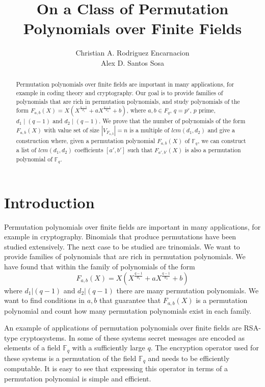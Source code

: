 \documentclass{article}
\theoremstyle{definition}
\theoremstyle{remark}
\numberwithin{equation}{section}
\begin{document}
\title{On a Class of Permutation Polynomials over Finite Fields}

\author{Christian A. Rodriguez Encarnacion \\ Alex D. Santos Sosa}

\maketitle

\begin{abstract}
Permutation polynomials over finite fields are important in many applications, for example in coding theory and cryptography. Our goal is to provide families of polynomials that are rich in permutation polynomials, and study polynomials of the form $F_{a,b}(X) =X\left(X^{\frac{q-1}{d_1}} + a X^{\frac{q-1}{d_2}} + b \right)$, where $a,b \in F_{q}$, $q=p^r$, $p$ prime, $d_1 \mid (q-1)$ and $d_2 \mid (q-1)$. We prove that the number of polynomials of the form $F_{a,b}(X)$ with value set of size $\left\vert V_{F_{a,b}} \right\vert =n$ is a multiple of $lcm(d_1,d_2)$ and give a construction where, given a permutation polynomial $F_{a,b}(X)$ of $\mathbb{F}_q$, we can construct a list of $lcm(d_1,d_2)$ coefficients $[a',b']$ such that $F_{a',b'}(X)$ is also a permutation polynomial of $\mathbb{F}_q$.
\end{abstract}


\section{Introduction}

Permutation polynomials over finite fields are important in many applications, for example in cryptography. Binomials that produce permutations have been studied extensively. The next case to be studied are trinomials. We want to provide families of polynomials that are rich in permutation polynomials. We have found that within the family of polynomials of the form $$F_{a,b}(X) = X(X^{\frac{q-1}{d_1}} + aX^{\frac{q-1}{d_2}} +b)$$ where $d_1 | (q-1)$ and $d_2 | (q-1)$  there are many permutation polynomials. We want to find conditions in $a,b$ that guarantee that $F_{a,b}(X)$ is a permutation polynomial and count how many permutation polynomials exist in each family.

An example of applications of permutation polynomials over finite fields are RSA-type cryptosystems. In some of these systems secret messages are encoded as elements of a field $\mathbb{F}_{q}$ with a sufficiently large $q$. The encryption operator used for these systems is a permutation of the field $\mathbb{F}_{q}$ and needs to be efficiently computable. It is easy to see that expressing this operator in terms of a permutation polynomial is simple and efficient.
\end{document}
